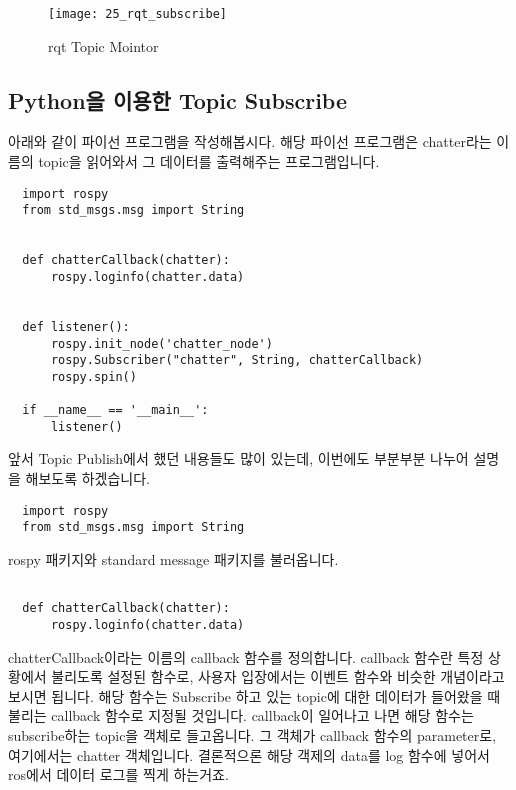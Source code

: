 \documentclass[11pt,fleqn]{book} %
\begin{document}
\begin{figure}[h]
\centering\texttt{[image: 25\_rqt\_subscribe]}
\caption{rqt Topic Mointor}
\end{figure}

\subsection{Python을 이용한 Topic Subscribe}

아래와 같이 파이선 프로그램을 작성해봅시다. 해당 파이선 프로그램은 chatter라는 이름의 topic을 읽어와서 그 데이터를 출력해주는 프로그램입니다.


\begin{verbatim}
  import rospy
  from std_msgs.msg import String


  def chatterCallback(chatter):
      rospy.loginfo(chatter.data)


  def listener():
      rospy.init_node('chatter_node')
      rospy.Subscriber("chatter", String, chatterCallback)
      rospy.spin()

  if __name__ == '__main__':
      listener()
\end{verbatim}

앞서 Topic Publish에서 했던 내용들도 많이 있는데, 이번에도 부분부분 나누어 설명을 해보도록 하겠습니다.

\begin{verbatim}
  import rospy
  from std_msgs.msg import String
\end{verbatim}

rospy 패키지와 standard message 패키지를 불러옵니다.

\begin{verbatim}

  def chatterCallback(chatter):
      rospy.loginfo(chatter.data)

\end{verbatim}

chatterCallback이라는 이름의 callback 함수를 정의합니다. callback 함수란 특정 상황에서 불리도록 설정된 함수로,
사용자 입장에서는 이벤트 함수와 비슷한 개념이라고 보시면 됩니다.
해당 함수는 Subscribe 하고 있는 topic에 대한 데이터가 들어왔을 때 불리는 callback 함수로 지정될 것입니다.
callback이 일어나고 나면 해당 함수는 subscribe하는 topic을 객체로 들고옵니다. 그 객체가 callback 함수의 parameter로, 여기에서는 chatter 객체입니다.
결론적으론 해당 객제의 data를 log 함수에 넣어서 ros에서 데이터 로그를 찍게 하는거죠.
\end{document}
